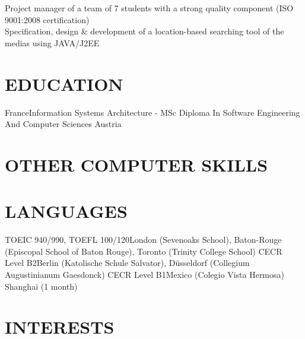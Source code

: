 \documentclass[11pt,a4paper]{moderncv}
\begin{document}
{}{Project manager of a team of 7 students with a strong quality component (ISO 9001:2008 certification)\\  Specification, design \& development of a location-based searching tool of the medias using JAVA/J2EE}{}

\section{EDUCATION}

{France}{}{Information Systems Architecture - MSc Diploma In Software Engineering And Computer Sciences}{}{}
{Austria}{}{}{}{}


\section{OTHER COMPUTER SKILLS}



\section{LANGUAGES}

{}{}{}
{}{TOEIC 940/990, TOEFL 100/120}{London (Sevenoaks School), Baton-Rouge (Episcopal School of Baton Rouge), Toronto (Trinity College School)}
{}{CECR Level B2}{Berlin (Katolische Schule Salvator), Düsseldorf (Collegium Augustinianum Gaesdonck)}
{}{CECR Level B1}{Mexico (Colegio Vista Hermosa)}
{}{}{Shanghai (1 month)}

\section{INTERESTS}


\nocite{*}
\end{document}
